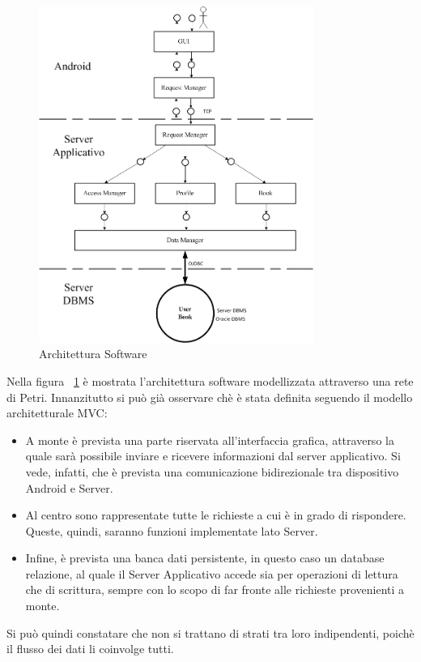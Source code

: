 \begin{figure}[h]
	\includegraphics[width=0.8\textwidth]{Immagini/Architettura_Software}
	\caption{Architettura Software}
	\label{fig:ArchitetturaSoftware}
\end{figure}
\newpage
Nella figura ~\ref{fig:ArchitetturaSoftware} è mostrata l'architettura software modellizzata attraverso una rete di Petri. Innanzitutto si può già osservare chè è stata definita seguendo il modello architetturale MVC:
\begin{itemize}
	\item A monte è prevista una parte riservata all'interfaccia grafica, attraverso la quale sarà possibile inviare e ricevere informazioni dal server applicativo. Si vede, infatti, che è prevista una comunicazione bidirezionale tra dispositivo Android e Server.
	\item Al centro sono rappresentate tutte le richieste a cui è in grado di rispondere. Queste, quindi, saranno funzioni implementate lato Server.
	\item Infine, è prevista una banca dati persistente, in questo caso un database relazione, al quale il Server Applicativo accede sia per operazioni di lettura che di scrittura, sempre con lo scopo di far fronte alle richieste provenienti a monte.
\end{itemize}
Si può quindi constatare che non si trattano di strati tra loro indipendenti, poichè il flusso dei dati li coinvolge tutti.